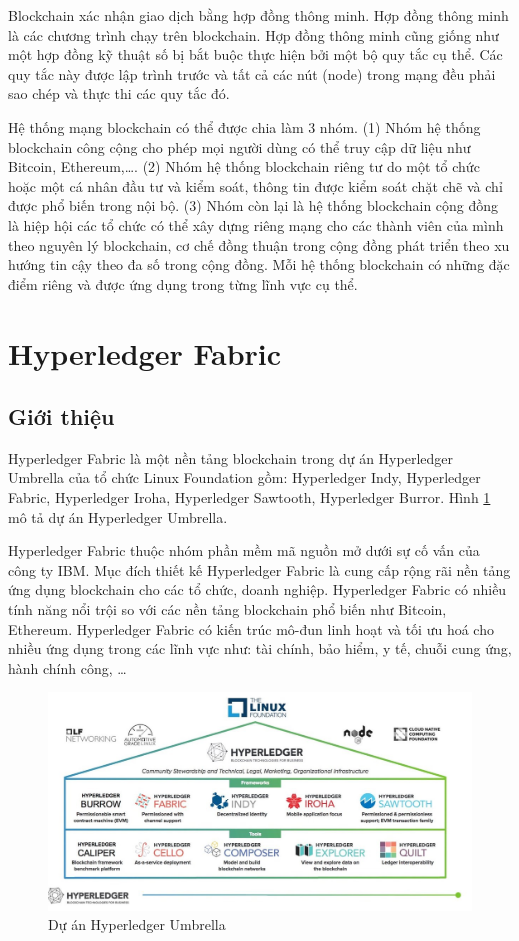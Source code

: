 Blockchain xác nhận giao dịch bằng hợp đồng thông minh. Hợp đồng thông minh là các chương trình chạy trên blockchain. Hợp đồng thông minh cũng giống như một hợp đồng kỹ thuật số bị bắt buộc thực hiện bởi một bộ quy tắc cụ thể. Các quy tắc này được lập trình trước và tất cả các nút (node) trong mạng đều phải sao chép và thực thi các quy tắc đó.

Hệ thống mạng blockchain có thể được chia làm 3 nhóm. (1) Nhóm hệ thống blockchain công cộng cho phép mọi người dùng có thể truy cập dữ liệu như Bitcoin, Ethereum,\ldots{}. (2) Nhóm hệ thống blockchain riêng tư do một tổ chức hoặc một cá nhân đầu tư và kiểm soát, thông tin được kiểm soát chặt chẽ và chỉ được phổ biến trong nội bộ. (3) Nhóm còn lại là hệ thống blockchain cộng đồng là hiệp hội các tổ chức có thể xây dựng riêng mạng cho các thành viên của mình theo nguyên lý blockchain, cơ chế đồng thuận trong cộng đồng phát triển theo xu hướng tin cậy theo đa số trong cộng đồng. Mỗi hệ thống blockchain có những đặc điểm riêng và được ứng dụng trong từng lĩnh vực cụ thể.

\section{Hyperledger Fabric}

\subsection{Giới thiệu}

Hyperledger Fabric là một nền tảng blockchain trong dự án Hyperledger Umbrella của tổ chức Linux Foundation gồm: Hyperledger Indy, Hyperledger Fabric, Hyperledger Iroha, Hyperledger Sawtooth, Hyperledger Burror. Hình \ref{fig:hlf_um} mô tả dự án Hyperledger Umbrella.

Hyperledger Fabric thuộc nhóm phần mềm mã nguồn mở dưới sự cố vấn của công ty IBM. Mục đích thiết kế Hyperledger Fabric là cung cấp rộng rãi nền tảng ứng dụng blockchain cho các tổ chức, doanh nghiệp. Hyperledger Fabric có nhiều tính năng nổi trội so với các nền tảng blockchain phổ biến như Bitcoin, Ethereum. Hyperledger Fabric có kiến trúc mô-đun linh hoạt và tối ưu hoá cho nhiều ứng dụng trong các lĩnh vực như: tài chính, bảo hiểm, y tế, chuỗi cung ứng, hành chính công, \ldots{}

\begin{figure}[htbp]
\centering
\includegraphics[width=.9\linewidth]{img/hlf_um.jpg}
\caption{Dự án Hyperledger Umbrella}
\label{fig:hlf_um}
\end{figure}


